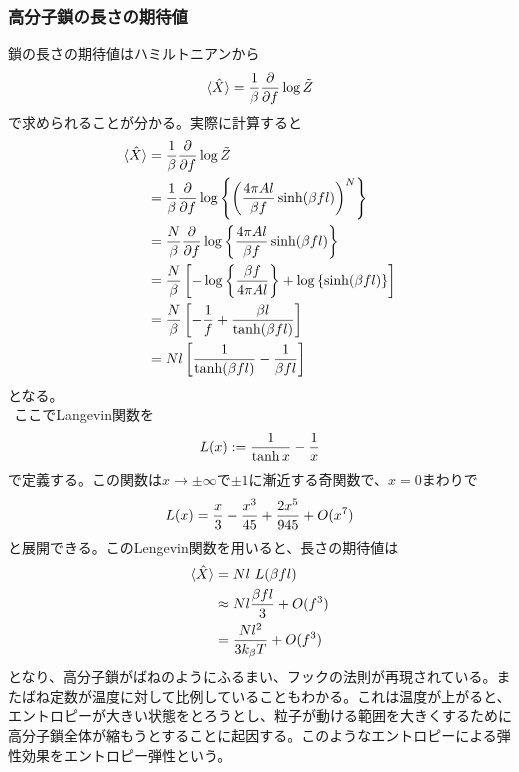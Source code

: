 \documentclass[dvipdfmx, 11pt, a4paper]{jsarticle}
\theoremstyle{definition}
\begin{document}
\subsubsection{高分子鎖の長さの期待値}
    鎖の長さの期待値はハミルトニアンから
    \begin{align}
        \langle \hat{X} \rangle = \frac{1}{\beta} \frac{\partial}{\partial f} \log \tilde{Z} \notag 
    \end{align}
    で求められることが分かる。実際に計算すると
    \begin{align}
        \langle \hat{X} \rangle &= \frac{1}{\beta} \frac{\partial}{\partial f} \log \tilde{Z} \notag \\
        &= \frac{1}{\beta} \frac{\partial}{\partial f} \log \left\{ \left(  \frac{4\pi A l}{\beta f} \sinh (\beta f l) \right)^N \right\} \notag \\
        &= \frac{N}{\beta} \frac{\partial}{\partial f} \log \left\{ \frac{4\pi A l}{\beta f} \sinh (\beta f l) \right\} \notag \\
        &= \frac{N}{\beta} \left[ -\log \left\{ \frac{\beta f}{4\pi A l} \right\} + \log \left\{ \sinh (\beta f l) \right\}\right] \notag \\
        &= \frac{N}{\beta} \left[ -\frac{1}{f} + \frac{\beta l}{\tanh (\beta f l)}\right] \notag \\
        &= Nl \left[ \frac{1}{\tanh (\beta f l)} - \frac{1}{\beta f l}\right] 
    \end{align}
    となる。\\
    $\ \ $ここでLangevin関数を
    \begin{align}
        L(x) := \frac{1}{\tanh x} - \frac{1}{x} \notag 
    \end{align}
    で定義する。この関数は$x \to \pm \infty$で$\pm1$に漸近する奇関数で、$x=0$まわりで
    \begin{align}
        L(x) = \frac{x}{3} - \frac{x^3}{45} + \frac{2x^5}{945} + O(x^7) \notag 
    \end{align}
    と展開できる。このLengevin関数を用いると、長さの期待値は
    \begin{align}
        \langle \hat{X}\rangle &= Nl\ L(\beta f l) \notag \\
        &\approx Nl \frac{\beta f l}{3} + O(f^3)\notag \\
        &= \frac{Nl^2}{3k_\beta T} + O(f^3)
    \end{align}
    となり、高分子鎖がばねのようにふるまい、フックの法則が再現されている。またばね定数が温度に対して比例していることもわかる。これは温度が上がると、エントロピーが大きい状態をとろうとし、粒子が動ける範囲を大きくするために高分子鎖全体が縮もうとすることに起因する。このようなエントロピーによる弾性効果をエントロピー弾性という。
\end{document}
